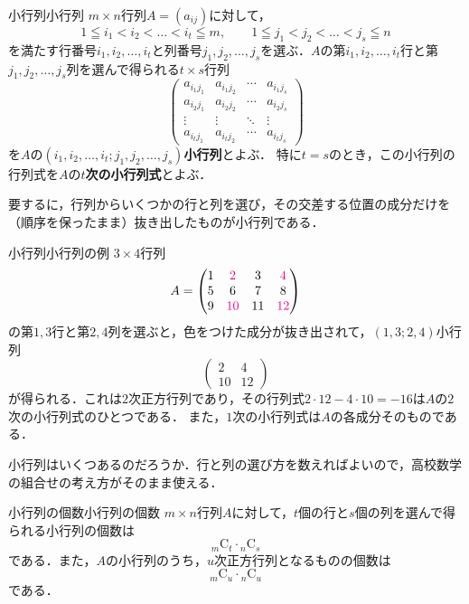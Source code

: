 \begin{definition}{小行列}{小行列}
  $m \times n$行列$A=(a_{ij})$に対して，
  \[
  1 \leqq i_1 < i_2 < \dots < i_t \leqq m,
  \qquad
  1 \leqq j_1 < j_2 < \dots < j_s \leqq n
  \]
  を満たす行番号$i_1,i_2,\dots,i_t$と列番号$j_1,j_2,\dots,j_s$を選ぶ．$A$の第$i_1,i_2,\dots,i_t$行と第$j_1,j_2,\dots,j_s$列を選んで得られる$t \times s$行列
  \[
  \begin{pmatrix}
  a_{i_1 j_1} & a_{i_1 j_2} & \cdots & a_{i_1 j_s} \\
  a_{i_2 j_1} & a_{i_2 j_2} & \cdots & a_{i_2 j_s} \\
  \vdots      & \vdots      & \ddots & \vdots      \\
  a_{i_t j_1} & a_{i_t j_2} & \cdots & a_{i_t j_s}
  \end{pmatrix}
  \]
  を$A$の\textbf{$(i_1,i_2,\dots,i_t ; j_1,j_2,\dots,j_s)$小行列}とよぶ．
  特に$t=s$のとき，この小行列の行列式を$A$の\textbf{$t$次の小行列式}とよぶ．
\end{definition}

要するに，行列からいくつかの行と列を選び，その交差する位置の成分だけを（順序を保ったまま）抜き出したものが小行列である．

\begin{example}{小行列}{小行列の例}
  $3 \times 4$行列
  \[
    A = \begin{pmatrix}
      1 & \textcolor{magenta}{2} & 3 & \textcolor{magenta}{4} \\
      5 & 6 & 7 & 8 \\
      9 & \textcolor{magenta}{10} & 11 & \textcolor{magenta}{12}
    \end{pmatrix}
  \]
  の第$1,3$行と第$2,4$列を選ぶと，色をつけた成分が抜き出されて，$(1, 3 ; 2, 4)$小行列
  \[
    \begin{pmatrix} 2 & 4 \\ 10 & 12 \end{pmatrix}
  \]
  が得られる．これは$2$次正方行列であり，その行列式$2 \cdot 12 - 4 \cdot 10 = -16$は$A$の$2$次の小行列式のひとつである．
  また，$1$次の小行列式は$A$の各成分そのものである．
\end{example}

小行列はいくつあるのだろうか．行と列の選び方を数えればよいので，高校数学の組合せの考え方がそのまま使える．

\begin{prop}{小行列の個数}{小行列の個数}
  $m \times n$行列$A$に対して，$t$個の行と$s$個の列を選んで得られる小行列の個数は
  \[
  {}_m \mathrm{C}_t \cdot {}_n \mathrm{C}_s
  \]
  である．また，$A$の小行列のうち，$u$次正方行列となるものの個数は
  \[
  {}_m \mathrm{C}_u \cdot {}_n \mathrm{C}_u
  \]
  である．
\end{prop}

